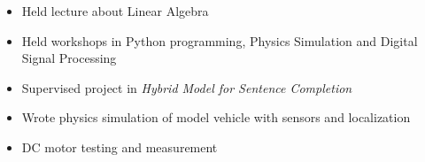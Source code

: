 \documentclass[10pt,a4paper]{altacv}
\begin{document}
\tagline{}

%

\begin{fullwidth}
\makecvheader 
\end{fullwidth}

%





\begin{itemize}
    \item   \small{Held lecture about Linear Algebra}
    \item   \small{Held workshops in Python programming, Physics Simulation and Digital Signal Processing}
    \item   \small{Supervised project in \textit{Hybrid Model for Sentence Completion}}
\end{itemize}

\medskip
\divider



\begin{itemize}
    \item   \small{Wrote physics simulation of model vehicle with sensors and localization}
    \item   \small{DC motor testing and measurement} \\
    \smallskip
     
\end{itemize}
\end{document}
